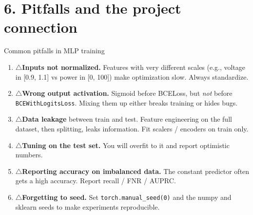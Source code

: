 \documentclass[aspectratio=169,10pt]{beamer}
\newcommand{\code}[1]{\texttt{#1}}
\newcommand{\warnitem}{\textcolor{warnorange}{\Large$\triangle$}\;}
\begin{document}
\section*{6. Pitfalls and the project connection}

\begin{frame}{Common pitfalls in MLP training}
\begin{enumerate}
  \item \warnitem \textbf{Inputs not normalized.} Features with very different scales (e.g., voltage in [0.9, 1.1] vs power in [0, 100]) make optimization slow. Always standardize.
  \item \warnitem \textbf{Wrong output activation.} Sigmoid before BCELoss, but \emph{not} before \code{BCEWithLogitsLoss}. Mixing them up either breaks training or hides bugs.
  \item \warnitem \textbf{Data leakage} between train and test. Feature engineering on the full dataset, then splitting, leaks information. Fit scalers / encoders on train only.
  \item \warnitem \textbf{Tuning on the test set.} You will overfit to it and report optimistic numbers.
  \item \warnitem \textbf{Reporting accuracy on imbalanced data.} The constant predictor often gets a high accuracy. Report recall / FNR / AUPRC.
  \item \warnitem \textbf{Forgetting to seed.} Set \code{torch.manual\_seed(0)} and the numpy and sklearn seeds to make experiments reproducible.
\end{enumerate}
\end{frame}
\end{document}
